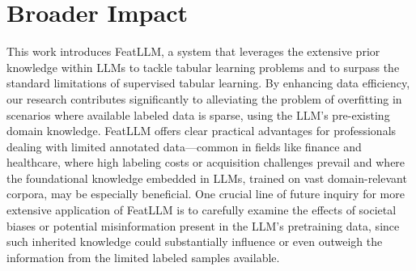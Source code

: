 \section{Broader Impact} 
This work introduces \textsf{FeatLLM}, a system that leverages the extensive prior knowledge within LLMs to tackle tabular learning problems and to surpass the standard limitations of supervised tabular learning. By enhancing data efficiency, our research contributes significantly to alleviating the problem of overfitting in scenarios where available labeled data is sparse, using the LLM's pre-existing domain knowledge. \textsf{FeatLLM} offers clear practical advantages for professionals dealing with limited annotated data—common in fields like finance and healthcare, where high labeling costs or acquisition challenges prevail and where the foundational knowledge embedded in LLMs, trained on vast domain-relevant corpora, may be especially beneficial. One crucial line of future inquiry for more extensive application of \textsf{FeatLLM} is to carefully examine the effects of societal biases or potential misinformation present in the LLM’s pretraining data, since such inherited knowledge could substantially influence or even outweigh the information from the limited labeled samples available.

